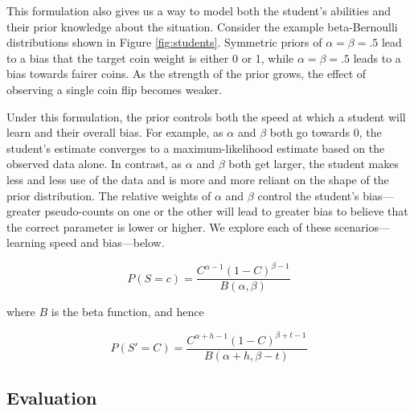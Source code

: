 \documentclass[10pt,letterpaper]{article}
\begin{document}
This formulation also gives us a way to model both the student's abilities and their prior knowledge about the situation. Consider the example beta-Bernoulli distributions shown in Figure \ref{fig:students}. Symmetric priors of $\alpha=\beta=.5$ lead to a bias that the target coin weight is either 0 or 1, while $\alpha=\beta=.5$ leads to a bias towards fairer coins. As the strength of the prior grows, the effect of observing a single coin flip becomes weaker. 

Under this formulation, the prior controls both the speed at which a student will learn and their overall bias. For example, as $\alpha$ and $\beta$ both go towards 0, the student's estimate converges to a maximum-likelihood estimate based on the observed data alone. In contrast, as $\alpha$ and $\beta$ both get larger, the student makes less and less use of the data and is more and more reliant on the shape of the prior distribution. The relative weights of $\alpha$ and $\beta$ control the student's bias---greater pseudo-counts on one or the other will lead to greater bias to believe that the correct parameter is lower or higher. We explore each of these scenarios---learning speed and bias---below.

\begin{equation}
P(S = c) = \frac{C^{\alpha-1}(1-C)^{\beta-1}}{B(\alpha,\beta)} 
\end{equation}

where $B$ is the beta function, and hence

\begin{equation}
P(S' = C)  = \frac{C^{\alpha+h-1}(1-C)^{\beta+t-1}}{B(\alpha+h,\beta-t)} 
\end{equation}

\subsection{Evaluation}


\end{document}
